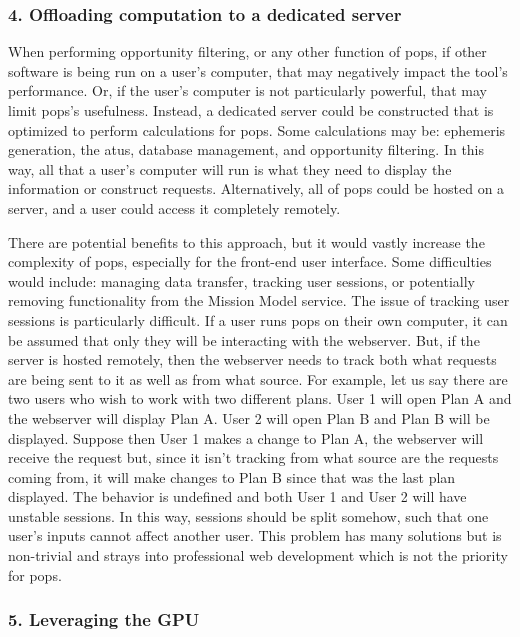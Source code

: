 \subsubsection{4. Offloading computation to a dedicated server}

When performing opportunity filtering, or any other function of \gls{pops}, if
other software is being run on a user's computer, that may negatively impact
the tool's performance. Or, if the user's computer is not particularly
powerful, that may limit \gls{pops}'s usefulness. Instead, a dedicated server
could be constructed that is optimized to perform calculations for \gls{pops}.
Some calculations may be: ephemeris generation, the \glspl{atu}, database
management, and opportunity filtering. In this way, all that a user's computer
will run is what they need to display the information or construct requests.
Alternatively, all of \gls{pops} could be hosted on a server, and a user could
access it completely remotely. 

There are potential benefits to this approach, but it would vastly increase the
complexity of \gls{pops}, especially for the front-end user interface. Some
difficulties would include: managing data transfer, tracking user sessions, or
potentially removing functionality from the Mission Model service. The issue of
tracking user sessions is particularly difficult. If a user runs \gls{pops} on
their own computer, it can be assumed that only they will be interacting with
the webserver. But, if the server is hosted remotely, then the webserver needs
to track both what requests are being sent to it as well as from what source.
For example, let us say there are two users who wish to work with two different
plans. User 1 will open Plan A and the webserver will display Plan A. User 2
will open Plan B and Plan B will be displayed. Suppose then User 1 makes a
change to Plan A, the webserver will receive the request but, since it isn't
tracking from what source are the requests coming from, it will make changes to
Plan B since that was the last plan displayed.  The behavior is undefined and
both User 1 and User 2 will have unstable sessions.  In this way, sessions
should be split somehow, such that one user's inputs cannot affect another
user. This problem has many solutions but is non-trivial and strays into
professional web development which is not the priority for \gls{pops}. 


\subsubsection{5. Leveraging the GPU}

